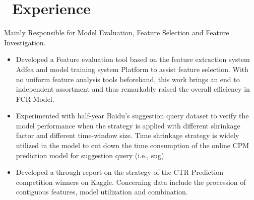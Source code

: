 \documentclass{resume}
\begin{document}
\section{\faUsers\ Experience}
Mainly Responsible for Model Evaluation, Feature Selection and Feature Investigation.
\begin{itemize}

\item Developed a Feature evaluation tool based on the feature extraction system Adfea and model training system Platform to assist feature selection. With no uniform feature analysis tools beforehand, this work brings an end to independent assortment and thus remarkably raised the overall efficiency in FCR-Model.
\item Experimented with half-year Baidu’s suggestion query dataset to verify the model performance when the strategy is applied with different shrinkage factor and different time-window size. Time shrinkage strategy is widely utilized in the model to cut down the time consumption of the online CPM prediction model for suggestion query (i.e., sug). 
\item Developed a through report on the strategy of the CTR Prediction competition winners on Kaggle. Concerning data include the procession of contiguous features, model utilization and combination.
\end{itemize}
\end{document}
